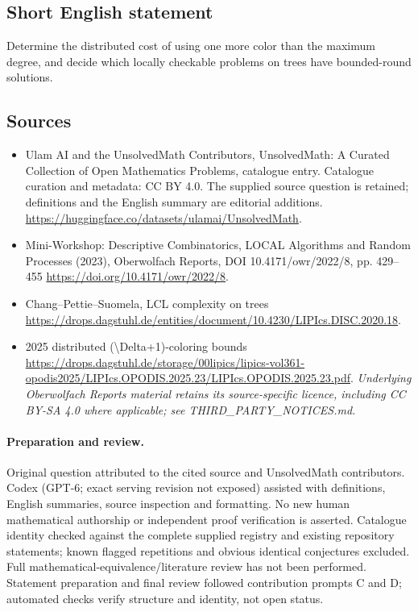 \documentclass[11pt]{article}
\begin{document}
\subsection{Short English statement}
Determine the distributed cost of using one more color than the maximum degree, and decide which locally checkable problems on trees have bounded-round solutions.
\subsection{Sources}
\begin{itemize}
\item[\hypertarget{source:statement:1}{S1}] Ulam AI and the UnsolvedMath Contributors, UnsolvedMath: A Curated Collection of Open Mathematics Problems, catalogue entry. Catalogue curation and metadata: CC BY 4.0. The supplied source question is retained; definitions and the English summary are editorial additions.
\url{https://huggingface.co/datasets/ulamai/UnsolvedMath}.
\item[\hypertarget{source:statement:2}{S2}] Mini-Workshop: Descriptive Combinatorics, LOCAL Algorithms and Random Processes (2023), Oberwolfach Reports, DOI 10.4171/owr/2022/8, pp. 429--455
\url{https://doi.org/10.4171/owr/2022/8}.
\item[\hypertarget{source:statement:3}{S3}] Chang--Pettie--Suomela, LCL complexity on trees
\url{https://drops.dagstuhl.de/entities/document/10.4230/LIPIcs.DISC.2020.18}.
\item[\hypertarget{source:statement:4}{S4}] 2025 distributed (\textbackslash{}Delta+1)-coloring bounds
\url{https://drops.dagstuhl.de/storage/00lipics/lipics-vol361-opodis2025/LIPIcs.OPODIS.2025.23/LIPIcs.OPODIS.2025.23.pdf}.
\textit{Underlying Oberwolfach Reports material retains its source-specific licence, including CC BY-SA 4.0 where applicable; see THIRD\_PARTY\_NOTICES.md.}
\end{itemize}
\paragraph{Preparation and review.}
Original question attributed to the cited source and UnsolvedMath contributors. Codex (GPT-6; exact serving revision not exposed) assisted with definitions, English summaries, source inspection and formatting. No new human mathematical authorship or independent proof verification is asserted. Catalogue identity checked against the complete supplied registry and existing repository statements; known flagged repetitions and obvious identical conjectures excluded. Full mathematical-equivalence/literature review has not been performed. Statement preparation and final review followed contribution prompts C and D; automated checks verify structure and identity, not open status.
\label{end:statement}
\end{document}
